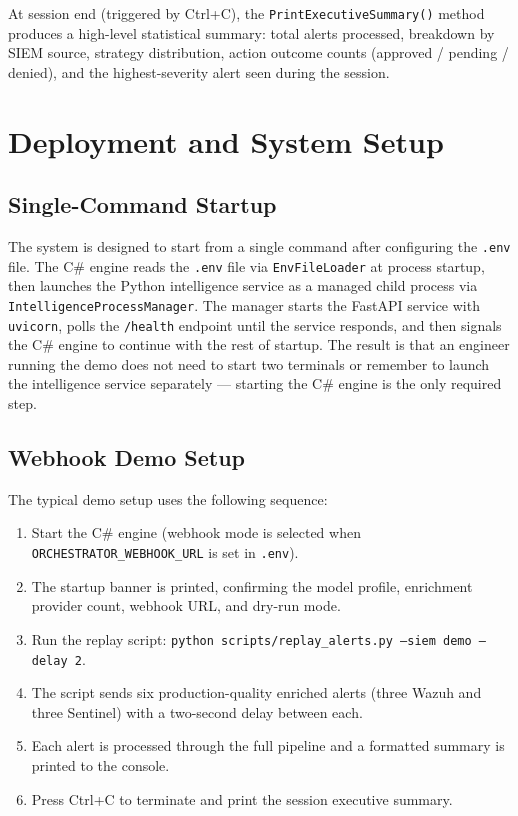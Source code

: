 At session end (triggered by Ctrl+C), the \texttt{PrintExecutiveSummary()} method produces a high-level statistical summary: total alerts processed, breakdown by SIEM source, strategy distribution, action outcome counts (approved / pending / denied), and the highest-severity alert seen during the session.

\section{Deployment and System Setup}
\label{sec:impl-deployment}

\subsection{Single-Command Startup}

The system is designed to start from a single command after configuring the \texttt{.env} file. The C\# engine reads the \texttt{.env} file via \texttt{EnvFileLoader} at process startup, then launches the Python intelligence service as a managed child process via \texttt{IntelligenceProcessManager}. The manager starts the FastAPI service with \texttt{uvicorn}, polls the \texttt{/health} endpoint until the service responds, and then signals the C\# engine to continue with the rest of startup. The result is that an engineer running the demo does not need to start two terminals or remember to launch the intelligence service separately --- starting the C\# engine is the only required step.

\subsection{Webhook Demo Setup}

The typical demo setup uses the following sequence:

\begin{enumerate}
    \item Start the C\# engine (webhook mode is selected when \texttt{ORCHESTRATOR\_WEBHOOK\_URL} is set in \texttt{.env}).
    \item The startup banner is printed, confirming the model profile, enrichment provider count, webhook URL, and dry-run mode.
    \item Run the replay script: \texttt{python scripts/replay\_alerts.py --siem demo --delay 2}.
    \item The script sends six production-quality enriched alerts (three Wazuh and three Sentinel) with a two-second delay between each.
    \item Each alert is processed through the full pipeline and a formatted summary is printed to the console.
    \item Press Ctrl+C to terminate and print the session executive summary.
\end{enumerate}

